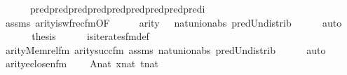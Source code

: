 \begin{isabellebody}
\ \ \ \ \ \ pred{\isacharparenleft}{\kern0pt}pred{\isacharparenleft}{\kern0pt}pred{\isacharparenleft}{\kern0pt}pred{\isacharparenleft}{\kern0pt}pred{\isacharparenleft}{\kern0pt}pred{\isacharparenleft}{\kern0pt}pred{\isacharparenleft}{\kern0pt}pred{\isacharparenleft}{\kern0pt}pred{\isacharparenleft}{\kern0pt}i{\isacharparenright}{\kern0pt}{\isacharparenright}{\kern0pt}{\isacharparenright}{\kern0pt}{\isacharparenright}{\kern0pt}{\isacharparenright}{\kern0pt}{\isacharparenright}{\kern0pt}{\isacharparenright}{\kern0pt}{\isacharparenright}{\kern0pt}{\isacharparenright}{\kern0pt}{\isachardoublequoteclose}\isanewline
\ \ \ \ \isamarkupfalse%
\ assms\ arity{\isacharunderscore}{\kern0pt}is{\isacharunderscore}{\kern0pt}wfrec{\isacharunderscore}{\kern0pt}fm{\isacharbrackleft}{\kern0pt}OF\ {\isacartoucheopen}{\isacharquery}{\kern0pt}{\isasymphi}{\isasymin}{\isacharunderscore}{\kern0pt}{\isacartoucheclose}\ {\isacharunderscore}{\kern0pt}\ {\isacharunderscore}{\kern0pt}\ {\isacharunderscore}{\kern0pt}\ {\isacharunderscore}{\kern0pt}\ {\isacartoucheopen}arity{\isacharparenleft}{\kern0pt}{\isacharquery}{\kern0pt}{\isasymphi}{\isacharparenright}{\kern0pt}\ {\isacharequal}{\kern0pt}\ {\isacharunderscore}{\kern0pt}{\isacartoucheclose}{\isacharbrackright}{\kern0pt}\ nat{\isacharunderscore}{\kern0pt}union{\isacharunderscore}{\kern0pt}abs{}\ pred{\isacharunderscore}{\kern0pt}Un{\isacharunderscore}{\kern0pt}distrib\isanewline
\ \ \ \ \isamarkupfalse%
\ auto\isanewline
\ \ \isamarkupfalse%
\isanewline
\ \ \isamarkupfalse%
\ {\isacharquery}{\kern0pt}thesis\isanewline
\ \ \ \ \isamarkupfalse%
\ is{\isacharunderscore}{\kern0pt}iterates{\isacharunderscore}{\kern0pt}fm{\isacharunderscore}{\kern0pt}def\ \isanewline
\ \ \ \ \isamarkupfalse%
\ arity{\isacharunderscore}{\kern0pt}Memrel{\isacharunderscore}{\kern0pt}fm\ arity{\isacharunderscore}{\kern0pt}succ{\isacharunderscore}{\kern0pt}fm\ assms\ nat{\isacharunderscore}{\kern0pt}union{\isacharunderscore}{\kern0pt}abs{}\ pred{\isacharunderscore}{\kern0pt}Un{\isacharunderscore}{\kern0pt}distrib\isanewline
\ \ \ \ \isamarkupfalse%
\ auto\isanewline
{}\isamarkupfalse%
%
\endisatagproof
{\isafoldproof}%
%
\isadelimproof
\isanewline
%
\endisadelimproof
\isanewline
{}\isamarkupfalse%
\ arity{\isacharunderscore}{\kern0pt}eclose{\isacharunderscore}{\kern0pt}n{\isacharunderscore}{\kern0pt}fm\ {\isacharcolon}{\kern0pt}\isanewline
\ \ \ {\isachardoublequoteopen}A{\isasymin}nat{\isachardoublequoteclose}\ {\isachardoublequoteopen}x{\isasymin}nat{\isachardoublequoteclose}\ {\isachardoublequoteopen}t{\isasymin}nat{\isachardoublequoteclose}\ \isanewline

\end{isabellebody}

